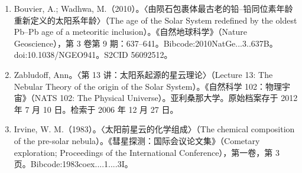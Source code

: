 \begin{enumerate}
\item Bouvier, A.; Wadhwa, M.（2010）。〈由陨石包裹体最古老的铅–铅同位素年龄重新定义的太阳系年龄〉（The age of the Solar System redefined by the oldest Pb–Pb age of a meteoritic inclusion）。《自然地球科学》（Nature Geoscience），第 3 卷第 9 期：637–641。Bibcode:2010NatGe...3..637B。doi:10.1038/NGEO941。S2CID 56092512。
\item Zabludoff, Ann。〈第 13 讲：太阳系起源的星云理论〉（Lecture 13: The Nebular Theory of the origin of the Solar System）。《自然科学 102：物理宇宙》（NATS 102: The Physical Universe）。亚利桑那大学。原始档案存于 2012 年 7 月 10 日。检索于 2006 年 12 月 27 日。
\item Irvine, W. M.（1983）。〈太阳前星云的化学组成〉（The chemical composition of the pre-solar nebula）。《彗星探测：国际会议论文集》（Cometary exploration; Proceedings of the International Conference），第一卷，第 3 页。Bibcode:1983coex....1....3I。
\end{enumerate}